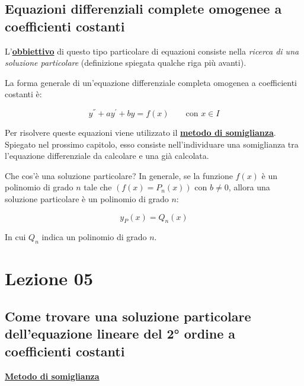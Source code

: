 \documentclass[a4paper]{article}
\begin{document}
	\newpage

	\subsection{Equazioni differenziali complete omogenee a coefficienti costanti}
	
	L'\textbf{\underline{obbiettivo}} di questo tipo particolare di equazioni consiste nella \emph{ricerca di una soluzione particolare} (definizione spiegata qualche riga più avanti).
	
	La forma generale di un'equazione differenziale completa omogenea a coefficienti costanti è:
	
	\begin{equation*}
		y^{''} + ay^{'} + by = f\left(x\right) \hspace{2em} \text{con } x \in I
	\end{equation*}

	Per risolvere queste equazioni viene utilizzato il \textcolor{Red3}{\textbf{\underline{metodo di somiglianza}}}. Spiegato nel prossimo capitolo, esso consiste nell'individuare una somiglianza tra l'equazione differenziale da calcolare e una già calcolata.\newline
	
	\noindent
	Che cos'è una soluzione particolare? In generale, se la funzione $f\left(x\right)$ è un polinomio di grado $n$ tale che $\left(f\left(x\right) = P_{n}\left(x\right)\right)$ con $b \ne 0$, allora una soluzione particolare è un polinomio di grado $n$:
	
	\begin{equation*}
		y_{P}\left(x\right) = Q_{n}\left(x\right)
	\end{equation*}

	\noindent
	In cui $Q_{n}$ indica un polinomio di grado $n$.
	
	\newpage
	
	\section{Lezione 05}
	
	\subsection{Come trovare una soluzione particolare dell'equazione lineare del 2° ordine a coefficienti costanti}
	
	\begin{center}
		\large
		\textcolor{Red3}{\textbf{\underline{Metodo di somiglianza}}}
	\end{center}
\end{document}
